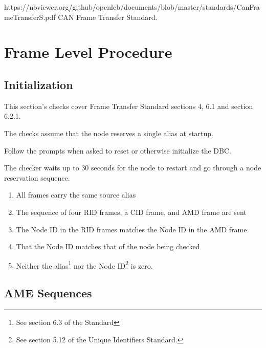 



\maketitle
\thispagestyle{firststyle}

\introductionCaveats
    {https://nbviewer.org/github/openlcb/documents/blob/master/standards/CanFrameTransferS.pdf}
    {CAN Frame Transfer Standard}.

\section{Frame Level Procedure}


\subsection{Initialization}

This section's checks cover Frame Transfer Standard sections 4, 6.1 and section 6.2.1.

The checks assume that the node reserves a single alias at startup.

Follow the prompts when asked to reset or otherwise initialize the DBC.

The checker waits up to 30 seconds for the node to restart and 
go through a node reservation sequence.

\begin{enumerate}
\item All frames carry the same source alias
\item The sequence of four RID frames, a CID frame, and AMD frame are sent
\item The Node ID in the RID frames matches the Node ID in the AMD frame
\item That the Node ID matches that of the node being checked
\item Neither the alias\footnote{See section 6.3 of the Standard} 
nor the Node ID\footnote{See section 5.12 of the Unique Identifiers Standard.}
is zero.
\end{enumerate}


\subsection{AME Sequences}

